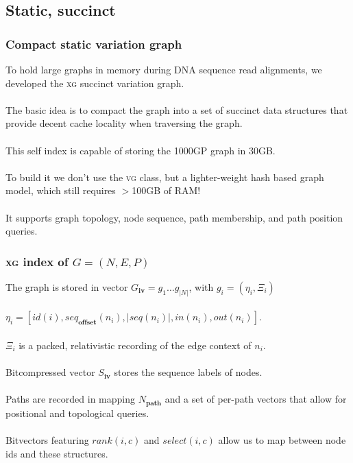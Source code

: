 \documentclass{beamer}
\begin{document}
\subsection{Static, succinct}
\begin{frame}[fragile]
  \frametitle{Compact static variation graph}
  To hold large graphs in memory during DNA sequence read alignments, we developed the \textsc{xg} succinct variation graph.
  \\~\\
  The basic idea is to compact the graph into a set of succinct data structures that provide decent cache locality when traversing the graph.
  \\~\\
  This self index is capable of storing the 1000GP graph in 30GB.
  \\~\\
  To build it we don't use the \textsc{vg} class, but a lighter-weight hash based graph model, which still requires $>$100GB of RAM!
  \\~\\
  It supports graph topology, node sequence, path membership, and path position queries.
\end{frame}

\begin{frame}
  \frametitle{\textsc{xg} index of $G = (N, E, P)$}
  The graph is stored in vector $G_\mathbf{iv} = g_1 \ldots g_{|N|}$, with $g_i = ( \eta_i, \Xi_i)$
  \\~\\
  $\eta_i = \left[ id(i), seq_\mathbf{offset}(n_i), |seq(n_i)|, in(n_i), out(n_i) \right]$.
  \\~\\
  $\Xi_i$ is a packed, relativistic recording of the edge context of $n_i$.
  \\~\\
  Bitcompressed vector $S_\mathbf{iv}$ stores the sequence labels of nodes.
  \\~\\
  Paths are recorded in mapping $N_\mathbf{path}$ and a set of per-path vectors that allow for positional and topological queries.
  \\~\\
  Bitvectors featuring $rank(i,c)$ and $select(i,c)$ allow us to map between node ids and these structures.
\end{frame}
\end{document}
